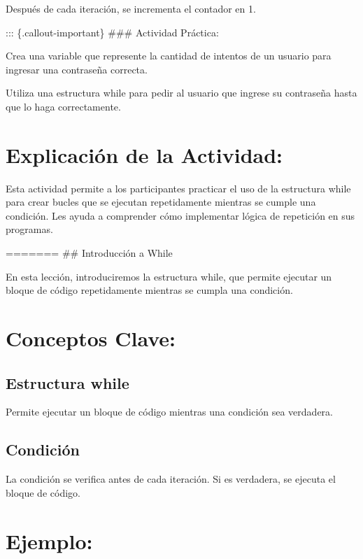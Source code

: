 \documentclass[
  a4paper,
  onepage,
  openany]{scrreprt}
\begin{document}
Después de cada iteración, se incrementa el contador en 1.

::: \{.callout-important\} \#\#\# Actividad Práctica:

Crea una variable que represente la cantidad de intentos de un usuario
para ingresar una contraseña correcta.

Utiliza una estructura while para pedir al usuario que ingrese su
contraseña hasta que lo haga correctamente.

\hypertarget{explicaciuxf3n-de-la-actividad-34}{%
\section{Explicación de la
Actividad:}\label{explicaciuxf3n-de-la-actividad-34}}

Esta actividad permite a los participantes practicar el uso de la
estructura while para crear bucles que se ejecutan repetidamente
mientras se cumple una condición. Les ayuda a comprender cómo
implementar lógica de repetición en sus programas.

======= \#\# Introducción a While

En esta lección, introduciremos la estructura while, que permite
ejecutar un bloque de código repetidamente mientras se cumpla una
condición.

\hypertarget{conceptos-clave-37}{%
\section{Conceptos Clave:}\label{conceptos-clave-37}}

\hypertarget{estructura-while-1}{%
\subsection{Estructura while}\label{estructura-while-1}}

Permite ejecutar un bloque de código mientras una condición sea
verdadera.

\hypertarget{condiciuxf3n-1}{%
\subsection{Condición}\label{condiciuxf3n-1}}

La condición se verifica antes de cada iteración. Si es verdadera, se
ejecuta el bloque de código.

\hypertarget{ejemplo-37}{%
\section{Ejemplo:}\label{ejemplo-37}}
\end{document}
